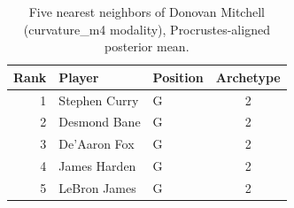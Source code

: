 \begin{table}[htbp]
  \centering\small
  \begin{tabular}{rllc}
    \toprule
    Rank & Player & Position & Archetype \\
    \midrule
    1 & Stephen Curry & G & 2 \\
    2 & Desmond Bane & G & 2 \\
    3 & De'Aaron Fox & G & 2 \\
    4 & James Harden & G & 2 \\
    5 & LeBron James & G & 2 \\
    \bottomrule
  \end{tabular}
  \caption{Five nearest neighbors of Donovan Mitchell (curvature_m4 modality), Procrustes-aligned posterior mean.}
  \label{tab:Donovan_Mitchell_neighbors_curvature_m4}
\end{table}

